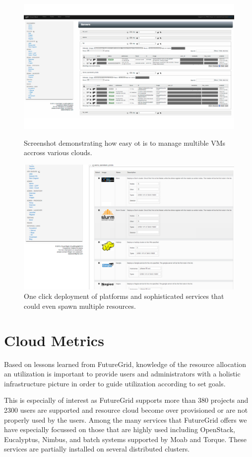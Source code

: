 \documentclass{tex/sig-alternate}
\begin{document}
{\begin{figure}[htb]
  \centering
    \includegraphics[width=1.0\columnwidth]{images/instances.pdf}
  \caption{Screenshot demonstrating how easy ot is to manage multible VMs accross various clouds.}\label{F:instances}
  \centering
    \includegraphics[width=1.0\columnwidth]{images/oneclick.pdf}
  \caption{One click deployment of platforms and sophisticated
    services that could even spawn multiple resources.}\label{F:oneclick}
\end{figure}

\section{Cloud Metrics}

Based on lessons learned from FutureGrid, knowledge of the resource
allocation an utilization is important to provide users and
administrators with a holistic infrastructure picture in order to guide
utilization according to set goals.

This is especially of interest as FutureGrid supports more than 380
projects and 2300 users are supported and resource cloud become over
provisioned or are not properly used by the users. Among the many
services that FutureGrid offers we have especially focussed on those
that are highly used including OpenStack, Eucalyptus, Nimbus, and
batch systems supported by Moab and Torque.  These services are
partially installed on several distributed clusters.

}
\end{document}
